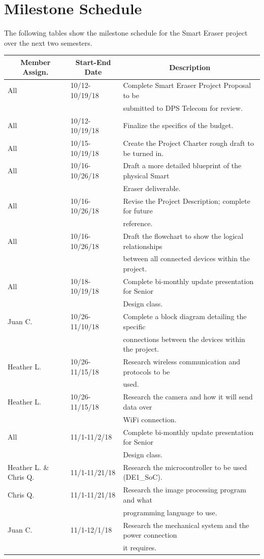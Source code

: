 \section{Milestone Schedule}
The following tables show the milestone schedule for the Smart Eraser project over the next two semesters.
\setlength{\parindent}{5ex}
\begin{table} [H]	
	\normalsize
	\centering
	\begin{tabular}{|l|l|l|}
		\hline
		\multicolumn{1}{|c|}{\textbf{Member Assign.}} & \multicolumn{1}{|c|}{\textbf{Start-End Date}} & \multicolumn{1}{|c|}{\textbf{Description}} \\
		\hline
		All & 10/12-10/19/18 & Complete Smart Eraser Project Proposal to be\\
		& & submitted to DPS Telecom for review. \\
		\hline
		All & 10/12-10/19/18 & Finalize the specifics of the budget. \\
		\hline
		All & 10/15-10/19/18 & 
		Create the Project Charter rough draft to be turned in.\\
		\hline
		All & 10/16-10/26/18 & Draft a more detailed blueprint of the physical Smart \\
		& & Eraser deliverable. \\
		\hline
		All & 10/16-10/26/18 & 
		Revise the Project Description; complete for future\\
		& & reference. \\
		\hline
		All & 10/16-10/26/18 & 
		Draft the flowchart to show the logical relationships \\
		& & between all connected devices within the project.\\
		\hline
		All & 10/18-10/19/18 & 
		Complete bi-monthly update presentation for Senior \\
		& & Design class. \\
		\hline
		Juan C. & 10/26-11/10/18 & 
		Complete a block diagram detailing the specific \\
		& & connections between the devices within the project.\\
		\hline
		Heather L. & 10/26-11/15/18 & 
		Research wireless communication and protocols to be\\
		& & used. \\
		\hline
		Heather L. & 10/26-11/15/18 & 
		Research the camera and how it will send data over  \\
		& & WiFi connection.\\
		\hline
		All & 11/1-11/2/18 & 
		Complete bi-monthly update presentation for Senior \\
		& & Design class. \\
		\hline
		Heather L. \& Chris Q. & 11/1-11/21/18 & 
		Research the microcontroller to be used  (DE1\_SoC).\\
		\hline
		Chris Q. & 11/1-11/21/18 & 
		Research the image processing program and what  \\
		& & programming language to use.\\
		\hline
		Juan C. & 11/1-12/1/18 &
		Research the mechanical system and the power connection \\
		& & it requires. \\
		\hline
		

\end{tabular}
\end{table}

